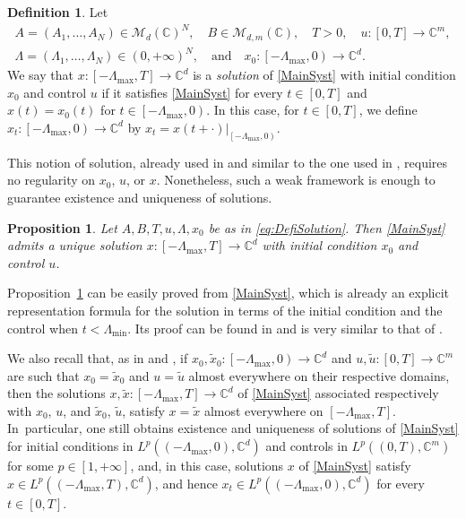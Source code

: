 \documentclass[10pt]{amsart}
\theoremstyle{plain}
\newtheorem{prop}[theo]{Proposition}
\theoremstyle{definition}
\newtheorem{defi}[theo]{Definition}
\begin{document}
\begin{defi}
\label{DefiSolution}
Let
\begin{equation}\label{eq:DefiSolution}
\begin{gathered}
A = (A_1, \dots, A_N) \in \mathcal M_d(\mathbb C)^N,\quad B \in \mathcal M_{d, m}(\mathbb C),\quad T > 0,\quad
u: [0, T] \to \mathbb C^m,\\
\Lambda = (\Lambda_1, \dots, \Lambda_N) \in (0, +\infty)^N,\quad \text{and}\quad x_0: \left[-\Lambda_{\max}, 0\right) \to \mathbb C^d.
\end{gathered}
\end{equation}
We say that $x: \left[-\Lambda_{\max}, T\right] \to \mathbb C^d$ is a \emph{solution} of \eqref{MainSyst} with initial condition $x_0$ and control $u$ if it satisfies \eqref{MainSyst} for every $t \in [0, T]$ and $x(t) = x_0(t)$ for $t \in \left[-\Lambda_{\max}, 0\right)$. In this case, for $t \in [0, T]$, we define $x_t: \left[-\Lambda_{\max}, 0\right) \to \mathbb C^d$ by $x_t = x(t + \cdot)|_{\left[-\Lambda_{\max}, 0\right)}$.
\end{defi}

This notion of solution, already used in \cite{Mazanti2017Relative} and similar to the one used in \cite{Chitour2016Stability}, requires no regularity on $x_0$, $u$, or $x$. Nonetheless, such a weak framework is enough to guarantee existence and uniqueness of solutions.

\begin{prop}
\label{PropControlDelayExistUnique}
Let $A,B,T,u,\Lambda,x_0$ be as in \eqref{eq:DefiSolution}. Then \eqref{MainSyst} admits a unique solution $x: \left[-\Lambda_{\max}, T\right] \to \mathbb C^d$ with initial condition $x_0$ and control $u$.
\end{prop}

Proposition~\ref{PropControlDelayExistUnique} can be easily proved from \eqref{MainSyst}, which is already an explicit representation formula for the solution in terms of the initial condition and the control when $t < \Lambda_{\min}$. Its proof can be found in \cite[Prop.\,2.2]{Mazanti2017Relative} and is very similar to that of \cite[Prop.\,3.2]{Chitour2016Stability}.

We also recall that, as in \cite[Rem.\,3.4]{Chitour2016Stability} and \cite[Rem.\,2.3]{Mazanti2017Relative}, if $x_0, \widetilde x_0: \left[-\Lambda_{\max}, 0\right) \to \mathbb C^d$ and $u, \widetilde u: [0, T] \to \mathbb C^m$ are such that $x_0 = \widetilde x_0$ and $u = \widetilde u$ almost everywhere on their respective domains, then the solutions $x, \widetilde x: \left[-\Lambda_{\max}, T\right] \to \mathbb C^d$ of \eqref{MainSyst} associated respectively with $x_0$, $u$, and $\widetilde x_0$, $\widetilde u$, satisfy $x = \widetilde x$ almost everywhere on $\left[-\Lambda_{\max}, T\right]$. In~particular, one still obtains existence and uniqueness of solutions of \eqref{MainSyst} for initial conditions in $L^p((-\Lambda_{\max}, 0), \mathbb C^d)$ and controls in $L^p((0, T), \mathbb C^m)$ for some $p \in [1, +\infty]$, and, in this case, solutions $x$ of \eqref{MainSyst} satisfy $x \in L^p(\left(-\Lambda_{\max}, T\right), \mathbb C^d)$, and hence $x_t \in L^p((-\Lambda_{\max}, 0), \mathbb C^d)$ for every $t \in [0, T]$.
\end{document}
